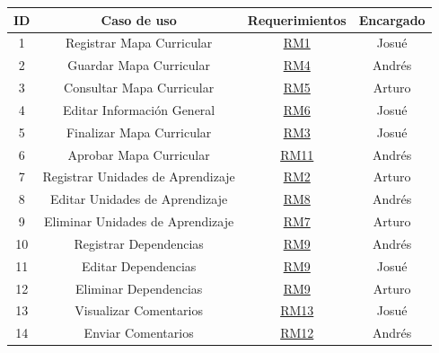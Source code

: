 \begin{center}
	\begin{tabular}{|c|c|c|c|}
		\hline
		ID & Caso de uso & Requerimientos & Encargado \\ \hline
        1 & Registrar Mapa Curricular & \hyperref[RM1]{RM1} & Josué \\ \hline
        2 & Guardar Mapa Curricular & \hyperref[RM4]{RM4} & Andrés \\ \hline
        3 & Consultar Mapa Curricular & \hyperref[RM5]{RM5} & Arturo \\ \hline
		4 & Editar Información General & \hyperref[RM6]{RM6} & Josué \\ \hline
        5 & Finalizar Mapa Curricular & \hyperref[RM3]{RM3} & Josué \\ \hline
        6 & Aprobar Mapa Curricular & \hyperref[RM11]{RM11} & Andrés \\ \hline
        7 & Registrar Unidades de Aprendizaje & \hyperref[RM2]{RM2} & Arturo \\ \hline
        8 & Editar Unidades de Aprendizaje & \hyperref[RM8]{RM8} & Andrés \\ \hline
        9 & Eliminar Unidades de Aprendizaje & \hyperref[RM7]{RM7} & Arturo \\ \hline
        10 & Registrar Dependencias & \hyperref[RM9]{RM9} & Andrés \\ \hline
        11 & Editar Dependencias & \hyperref[RM9]{RM9} & Josué \\ \hline
        12 & Eliminar Dependencias & \hyperref[RM9]{RM9} & Arturo \\ \hline
        13 & Visualizar Comentarios & \hyperref[RM13]{RM13} & Josué \\ \hline
        14 & Enviar Comentarios & \hyperref[RM12]{RM12} & Andrés \\ \hline
    \end{tabular}
\end{center}
